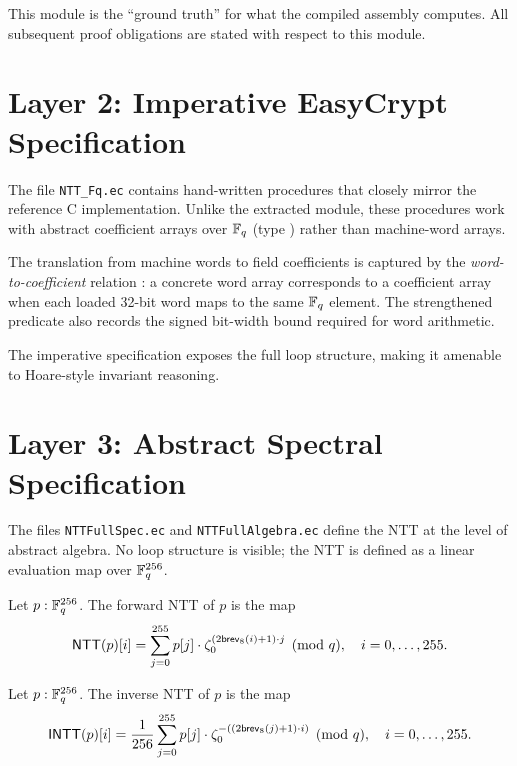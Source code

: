 This module is the ``ground truth'' for what the compiled assembly computes.
All subsequent proof obligations are stated with respect to this module.

\section{Layer 2: Imperative EasyCrypt Specification}

The file \texttt{NTT\_Fq.ec} contains hand-written \easycrypt{} procedures
that closely mirror the reference C implementation.  Unlike the extracted
module, these procedures work with abstract coefficient arrays over \(\mathbb{F}_q\)
(type ) rather than machine-word arrays.

The translation from machine words to field coefficients is captured by the
\emph{word-to-coefficient} relation : a concrete
 word array corresponds to a coefficient array when each
loaded 32-bit word maps to the same \(\mathbb{F}_q\) element.  The strengthened
 predicate also records the signed bit-width bound
required for word arithmetic.

The imperative specification exposes the full loop structure, making it
amenable to Hoare-style invariant reasoning.

\section{Layer 3: Abstract Spectral Specification}

The files \texttt{NTTFullSpec.ec} and \texttt{NTTFullAlgebra.ec} define the
NTT at the level of abstract algebra.  No loop structure is visible; the
NTT is defined as a linear evaluation map over $\mathbb{F}_q^{256}$.

\begin{definition}
  Let $p : \mathbb{F}_q^{256}$.  The forward NTT of $p$ is the map
  \[
    \mathsf{NTT}(p)[i] = \sum_{j=0}^{255} p[j] \cdot \zeta_0^{(2 \mathsf{brev}_8(i)+1) \cdot j}
    \pmod{q},\quad i = 0, \dots, 255.
  \]
\label{def:full_ntt}
\end{definition}

\begin{definition}
  Let $p : \mathbb{F}_q^{256}$.  The inverse NTT of $p$ is the map
  \[
    \mathsf{INTT}(p)[i] = \frac{1}{256} \sum_{j=0}^{255} p[j] \cdot
    \zeta_0^{-((2\mathsf{brev}_8(j)+1) \cdot i)} \pmod{q},\quad i = 0, \dots, 255.
  \]
\label{def:full_intt}
\end{definition}


